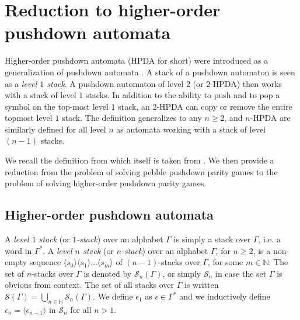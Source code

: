 \documentclass[a4paper,UKenglish,cleveref, autoref, thm-restate]{lipics-v2021}
\newcommand{\N}{\mathbb{N}}
\begin{document}
\section{Reduction to higher-order pushdown automata}\label{section HPDA}




Higher-order pushdown automata (HPDA for short) were introduced as a 
generalization of pushdown automata \cite{aho1969nested,Gre70,maslov1976multilevel}. 
A stack of a pushdown automaton is seen as a {\em level $1$ stack}. 
A pushdown automaton of level $2$ (or $2$-HPDA) then works with a stack of level $1$ stacks. 
In addition to the ability to push
and to pop a symbol on the top-most level $1$ stack, an $2$-HPDA can copy or remove the entire topmost level $1$ stack. 
The definition generalizes to any $n \geq 2$, and $n$-HPDA are similarly defined for all level
$n$ as automata working with a stack of level $(n-1)$ stacks.



We recall the definition from \cite{cachat2007complexity} which itself is taken from \cite{knapik2002higher}. We then provide a
reduction from the problem of solving pebble pushdown parity games to the problem of solving
higher-order pushdown parity games.


\subsection{Higher-order pushdown automata}

A {\em level $1$ stack} (or {\em $1$-stack}) over an alphabet $\Gamma$ is 
simply a %
	stack over $\Gamma$, i.e. a word  in $\Gamma^*$.
A  {\em level $n$ stack} (or {\em $n$-stack}) over an alphabet $\Gamma$, for $n \geq 2$, is a 
non-empty sequence
$ \langle s_0 \rangle \langle s_1 \rangle \ldots \langle s_m \rangle$
of
$(n-1)$-stacks over $\Gamma$,
for some $m \in \N$.
The set of $n$-stacks over $\Gamma$ is denoted by $\mathscr{S}_n(\Gamma)$,
or simply $\mathscr{S}_n$ in case the set $\Gamma$ is obvious from context.
The set of all stacks over $\Gamma$ is written $\mathscr{S}(\Gamma) = \bigcup_{n\in \N} \mathscr{S}_n(\Gamma)$.
We define $\epsilon_{1}$ as
$\epsilon \in \Gamma^*$ and we inductively define 
$\epsilon_{n} = \langle \epsilon_{n-1} \rangle$ in $\mathscr{S}_n$ for all $n > 1$.
\end{document}

